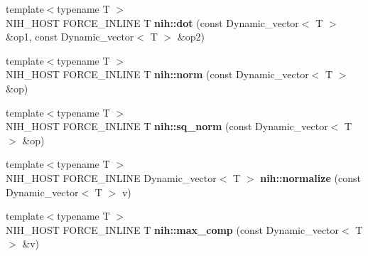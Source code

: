 \begin{DoxyCompactItemize}
\item 
\hypertarget{group__linalg_ga72d06d3777274c5086cec87f3e99e461}{
{\footnotesize template$<$typename T $>$ }\\\-N\-I\-H\-\_\-\-H\-O\-S\-T \-F\-O\-R\-C\-E\-\_\-\-I\-N\-L\-I\-N\-E \-T {\bfseries nih\-::dot} (const \-Dynamic\-\_\-vector$<$ \-T $>$ \&op1, const \-Dynamic\-\_\-vector$<$ \-T $>$ \&op2)}
\label{group__linalg_ga72d06d3777274c5086cec87f3e99e461}

\item 
\hypertarget{group__linalg_ga49ad4aac876edfaa63728dc050676fba}{
{\footnotesize template$<$typename T $>$ }\\\-N\-I\-H\-\_\-\-H\-O\-S\-T \-F\-O\-R\-C\-E\-\_\-\-I\-N\-L\-I\-N\-E \-T {\bfseries nih\-::norm} (const \-Dynamic\-\_\-vector$<$ \-T $>$ \&op)}
\label{group__linalg_ga49ad4aac876edfaa63728dc050676fba}

\item 
\hypertarget{group__linalg_ga9bb86f8547e3fa69786ebd68dc89057d}{
{\footnotesize template$<$typename T $>$ }\\\-N\-I\-H\-\_\-\-H\-O\-S\-T \-F\-O\-R\-C\-E\-\_\-\-I\-N\-L\-I\-N\-E \-T {\bfseries nih\-::sq\-\_\-norm} (const \-Dynamic\-\_\-vector$<$ \-T $>$ \&op)}
\label{group__linalg_ga9bb86f8547e3fa69786ebd68dc89057d}

\item 
\hypertarget{group__linalg_ga2cd050854a2ba194a8a51654c94ff3ca}{
{\footnotesize template$<$typename T $>$ }\\\-N\-I\-H\-\_\-\-H\-O\-S\-T \-F\-O\-R\-C\-E\-\_\-\-I\-N\-L\-I\-N\-E \*
\-Dynamic\-\_\-vector$<$ \-T $>$ {\bfseries nih\-::normalize} (const \-Dynamic\-\_\-vector$<$ \-T $>$ v)}
\label{group__linalg_ga2cd050854a2ba194a8a51654c94ff3ca}

\item 
\hypertarget{group__linalg_ga49b988bb0618de2ec668efe484c47e43}{
{\footnotesize template$<$typename T $>$ }\\\-N\-I\-H\-\_\-\-H\-O\-S\-T \-F\-O\-R\-C\-E\-\_\-\-I\-N\-L\-I\-N\-E \-T {\bfseries nih\-::max\-\_\-comp} (const \-Dynamic\-\_\-vector$<$ \-T $>$ \&v)}
\label{group__linalg_ga49b988bb0618de2ec668efe484c47e43}

\end{DoxyCompactItemize}


